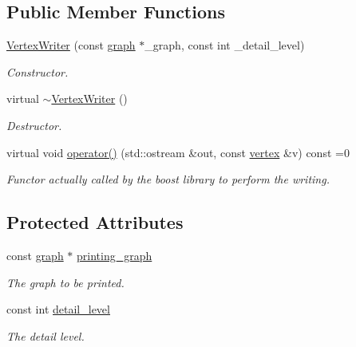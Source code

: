 \subsection*{Public Member Functions}
\begin{DoxyCompactItemize}
\item 
\hyperlink{classVertexWriter_a31937ec147215fe54c5ad3271799d965}{Vertex\+Writer} (const \hyperlink{structgraph}{graph} $\ast$\+\_\+graph, const int \+\_\+detail\+\_\+level)
\begin{DoxyCompactList}\small\item\em Constructor. \end{DoxyCompactList}\item 
virtual \hyperlink{classVertexWriter_a226773b6df8099770a64e3f66aaeddef}{$\sim$\+Vertex\+Writer} ()
\begin{DoxyCompactList}\small\item\em Destructor. \end{DoxyCompactList}\item 
virtual void \hyperlink{classVertexWriter_a9df92a65d6e59d160be56eb8ec5cb84c}{operator()} (std\+::ostream \&out, const \hyperlink{graph_8hpp_abefdcf0544e601805af44eca032cca14}{vertex} \&v) const =0
\begin{DoxyCompactList}\small\item\em Functor actually called by the boost library to perform the writing. \end{DoxyCompactList}\end{DoxyCompactItemize}
\subsection*{Protected Attributes}
\begin{DoxyCompactItemize}
\item 
const \hyperlink{structgraph}{graph} $\ast$ \hyperlink{classVertexWriter_a6251a08decfd5799557f8069cfde5d2e}{printing\+\_\+graph}
\begin{DoxyCompactList}\small\item\em The graph to be printed. \end{DoxyCompactList}\item 
const int \hyperlink{classVertexWriter_aa22b6ea9c9a75b7fce3767b00e08ed3f}{detail\+\_\+level}
\begin{DoxyCompactList}\small\item\em The detail level. \end{DoxyCompactList}\end{DoxyCompactItemize}


